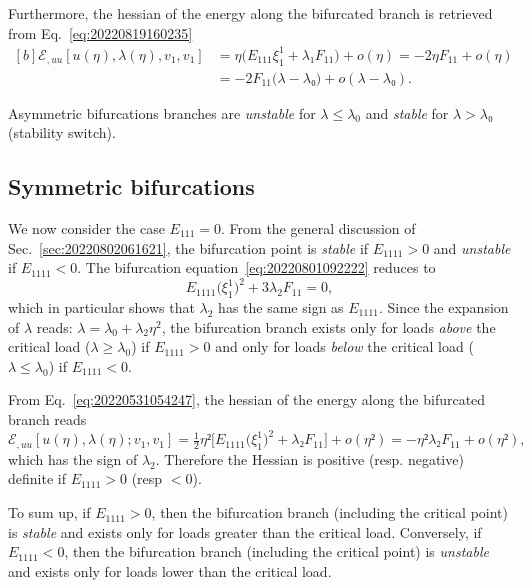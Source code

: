\documentclass[12pt, final]{scrartcl}
\theoremstyle{definition}
\begin{document}
Furthermore, the hessian of the energy along the bifurcated branch is retrieved
from Eq.~\eqref{eq:20220819160235}
\begin{equation}
  \begin{aligned}[b]
    ℰ_{, uu}[u(η), λ(η), v_1, v_1] &= η \bigl(E_{111} ξ_1^1 + λ₁ F_{11}\bigr) + o(η) = -2 η F_{11} + o(η)\\
    &= -2 F_{11} \bigl( λ - λ₀ \bigr) + o(λ - λ₀).
  \end{aligned}
\end{equation}

Asymmetric bifurcations branches are \emph{unstable} for \(λ ≤ λ_0\) and
\emph{stable} for \(λ > λ₀\) (stability switch).

\subsection{Symmetric bifurcations}

We now consider the case \(E_{111}=0\). From the general discussion of
Sec.~\ref{sec:20220802061621}, the bifurcation point is \emph{stable} if
\(E_{1111} > 0\) and \emph{unstable} if \(E_{1111} < 0\). The bifurcation
equation~\eqref{eq:20220801092222} reduces to
\begin{equation}
  E_{1111} \bigl( ξ_1^1 \bigr)^2 + 3λ_2 F_{11} = 0,
\end{equation}
which in particular shows that \(λ_2\) has the same sign as \(E_{1111}\). Since
the expansion of \(λ\) reads: \(λ = λ_0 + λ_2 η^2\), the bifurcation branch
exists only for loads \emph{above} the critical load (\(λ ≥ λ_0\)) if
\(E_{1111} > 0\) and only for loads \emph{below} the critical load (\(λ ≤ λ_0\))
if \(E_{1111} < 0\).

From Eq.~\eqref{eq:20220531054247}, the hessian of the energy along the
bifurcated branch reads
\begin{equation*}
  ℰ_{, uu}[u(η), λ(η); v_1, v_1] = \tfrac{1}{2} η² \bigl[ E_{1111}\bigl(ξ_1^1\bigr) ^2 + λ₂ F_{11} \bigr] + o(η²) = - η² λ₂ F_{11} + o(η²),
\end{equation*}
which has the sign of \(λ_2\). Therefore the Hessian is positive
(resp. negative) definite if \(E_{1111} > 0\) (resp \(< 0\)).

To sum up, if \(E_{1111} > 0\), then the bifurcation branch (including the
critical point) is \emph{stable} and exists only for loads greater than the
critical load. Conversely, if \(E_{1111} < 0\), then the bifurcation branch
(including the critical point) is \emph{unstable} and exists only for loads
lower than the critical load.
\end{document}
